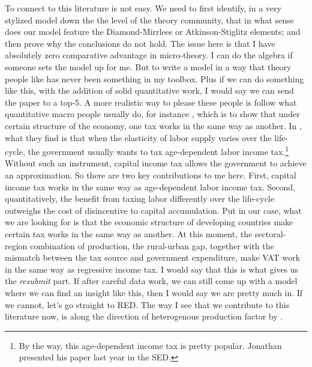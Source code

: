 \documentclass[twoside,11pt,leqno]{article}
\begin{document}
To connect to this literature is not easy. We need to first identify, in a very stylized model down the the level of the theory community, that in what sense does our model feature the Diamond-Mirrlees or Atkinson-Stiglitz elements; and then prove why the conclusions do not hold. The issue here is that I have absolutely zero comparative advantage in micro-theory. I can do the algebra if someone sets the model up for me. But to write a model in a way that theory people like has never been something in my toolbox. Plus if we can do something like this, with the addition of solid quantitative work, I would say we can send the paper to a top-5. A more realistic way to please these people is follow what quantitative macro people usually do, for instance \citet{Conesaetal:2009}, which is to show that under certain structure of the economy, one tax works in the same way as another. In \citet{Conesaetal:2009}, what they find is that when the elasticity of labor supply varies over the life-cycle, the government usually wants to tax age-dependent labor income tax.\footnote{By the way, this age-dependent income tax is pretty popular. Jonathan presented his paper \citet{Heathcoteetal:2019} last year in the SED.} Without such an instrument, capital income tax allows the government to achieve an approximation. So there are two key contributions to me here. First, capital income tax works in the same way as age-dependent labor income tax. Second, quantitatively, the benefit from taxing labor differently over the life-cycle outweighs the cost of disincentive to capital accumulation. Put in our case, what we are looking for is that the economic structure of developing countries make certain tax works in the same way as another. At this moment, the sectoral-region combination of production, the rural-urban gap, together with the mismatch between the tax source and government expenditure, make VAT work in the same way as regressive income tax. I would say that this is what gives us the \textit{resubmit} part. If after careful data work, we can still come up with a model where we can find an insight like this, then I would say we are pretty much in. If we cannot, let's go straight to RED. The way I see that we contribute to this literature now, is along the direction of heterogenous production factor by \citet{Naito:1999}.
\end{document}

